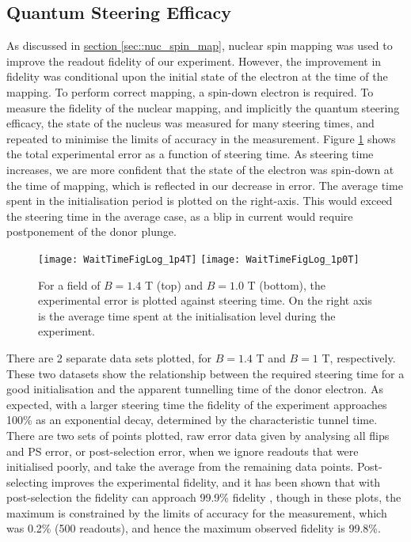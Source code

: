 \label{sec::results}
\subsection{Quantum Steering Efficacy}

	As discussed in \hyperref[sec::nuc_spin_map]{section \ref{sec::nuc_spin_map}}, nuclear spin mapping was used to improve the readout fidelity of our experiment. However, the improvement in fidelity was conditional upon the initial state of the electron at the time of the mapping. To perform correct mapping, a spin-down electron is required. To measure the fidelity of the nuclear mapping, and implicitly the quantum steering efficacy, the state of the nucleus was measured for many steering times, and repeated to minimise the limits of accuracy in the measurement. Figure \ref{fig::wait_time} shows the total experimental error as a function of steering time. As steering time increases, we are more confident that the state of the electron was spin-down at the time of mapping, which is reflected in our decrease in error. The average time spent in the initialisation period is plotted on the right-axis. This would exceed the steering time in the average case, as a blip in current would require postponement of the donor plunge.
	
	\begin{figure}[htbp!]
		\centering
		\vspace{-1cm}
		\texttt{[image: WaitTimeFigLog\_1p4T]}
		\texttt{[image: WaitTimeFigLog\_1p0T]}
		\caption{For a field of $B = 1.4$ T (top) and $B = 1.0$ T (bottom), the experimental error is plotted against steering time. On  the right axis is the average time spent at the initialisation level during the experiment.}
		\label{fig::wait_time}
	\end{figure}
	
	There are 2 separate data sets plotted, for $B = 1.4$ T and $B = 1$ T, respectively. These two datasets show the relationship between the required steering time for a good initialisation and the apparent tunnelling time of the donor electron. As expected, with a larger steering time the fidelity of the experiment approaches 100\% as an exponential decay, determined by the characteristic tunnel time. There are two sets of points plotted, raw error data given by analysing all flips and PS error, or post-selection error, when we ignore readouts that were initialised poorly, and take the average from the remaining data points. Post-selecting improves the experimental fidelity, and it has been shown that with post-selection the fidelity can approach 99.9\% fidelity , though in these plots, the maximum is constrained by the limits of accuracy for the measurement, which was 0.2\% (500 readouts), and hence the maximum observed fidelity is 99.8\%. 
	
